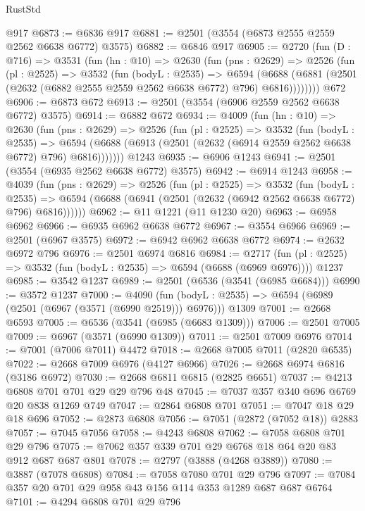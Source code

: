 \begin{lexlean}{RustStd}
\begin{coremodule}
{\begin{coremodule}
{{{{{{{{{{{{{{{{{{{{    @917
@6873 := @6836 @917
@6881 := @2501 (@3554 (@6873 @2555 @2559 @2562 @6638 @6772) @3575)
@6882 := @6846 @917
@6905 := @2720
    (fun (D : @716) =>
    @3531
      (fun (hn : @10) =>
      @2630
        (fun (pns : @2629) =>
        @2526
          (fun (pl : @2525) =>
          @3532
            (fun (bodyL : @2535) =>
            @6594
              (@6688 (@6881 (@2501 (@2632 (@6882 @2555 @2559 @2562 @6638 @6772) @796) @6816))))))))
    @672
@6906 := @6873 @672
@6913 := @2501 (@3554 (@6906 @2559 @2562 @6638 @6772) @3575)
@6914 := @6882 @672
@6934 := @4009
    (fun (hn : @10) =>
    @2630
      (fun (pns : @2629) =>
      @2526
        (fun (pl : @2525) =>
        @3532
          (fun (bodyL : @2535) =>
          @6594 (@6688 (@6913 (@2501 (@2632 (@6914 @2559 @2562 @6638 @6772) @796) @6816)))))))
    @1243
@6935 := @6906 @1243
@6941 := @2501 (@3554 (@6935 @2562 @6638 @6772) @3575)
@6942 := @6914 @1243
@6958 := @4039
    (fun (pns : @2629) =>
    @2526
      (fun (pl : @2525) =>
      @3532
        (fun (bodyL : @2535) =>
        @6594 (@6688 (@6941 (@2501 (@2632 (@6942 @2562 @6638 @6772) @796) @6816))))))
@6962 := @11 @1221 (@11 @1230 @20)
@6963 := @6958 @6962
@6966 := @6935 @6962 @6638 @6772
@6967 := @3554 @6966
@6969 := @2501 (@6967 @3575)
@6972 := @6942 @6962 @6638 @6772
@6974 := @2632 @6972 @796
@6976 := @2501 @6974 @6816
@6984 := @2717
    (fun (pl : @2525) => @3532 (fun (bodyL : @2535) => @6594 (@6688 (@6969 @6976))))
    @1237
@6985 := @3542 @1237
@6989 := @2501 (@6536 (@3541 (@6985 @6684)))
@6990 := @3572 @1237
@7000 := @4090
    (fun (bodyL : @2535) => @6594 (@6989 (@2501 (@6967 (@3571 (@6990 @2519))) @6976)))
    @1309
@7001 := @2668 @6593
@7005 := @6536 (@3541 (@6985 (@6683 @1309)))
@7006 := @2501 @7005
@7009 := @6967 (@3571 (@6990 @1309))
@7011 := @2501 @7009 @6976
@7014 := @7001 (@7006 @7011) @4472
@7018 := @2668 @7005 @7011 (@2820 @6535)
@7022 := @2668 @7009 @6976 (@4127 @6966)
@7026 := @2668 @6974 @6816 (@3186 @6972)
@7030 := @2668 @6811 @6815 (@2825 @6651)
@7037 := @4213 @6808 @701 @701 @29 @29 @796 @48
@7045 := @7037 @357 @340 @696 @6769 @20 @838 @1269 @749
@7047 := @2864 @6808 @701
@7051 := @7047 @18 @29 @18 @696
@7052 := @2873 @6808
@7056 := @7051 (@2872 (@7052 @18)) @2883
@7057 := @7045 @7056
@7058 := @4243 @6808
@7062 := @7058 @6808 @701 @29 @796
@7075 := @7062 @357 @339 @701 @29 @6768 @18 @64 @20 @83 @912 @687 @687 @801
@7078 := @2797 (@3888 (@4268 @3889))
@7080 := @3887 (@7078 @6808)
@7084 := @7058 @7080 @701 @29 @796
@7097 := @7084 @357 @20 @701 @29 @958 @43 @156 @114 @353 @1289 @687 @687 @6764
@7101 := @4294 @6808 @701 @29 @796
}}}}}}}}}}}}}}}}}}}}
\end{coremodule}}
\end{coremodule}
\end{lexlean}
